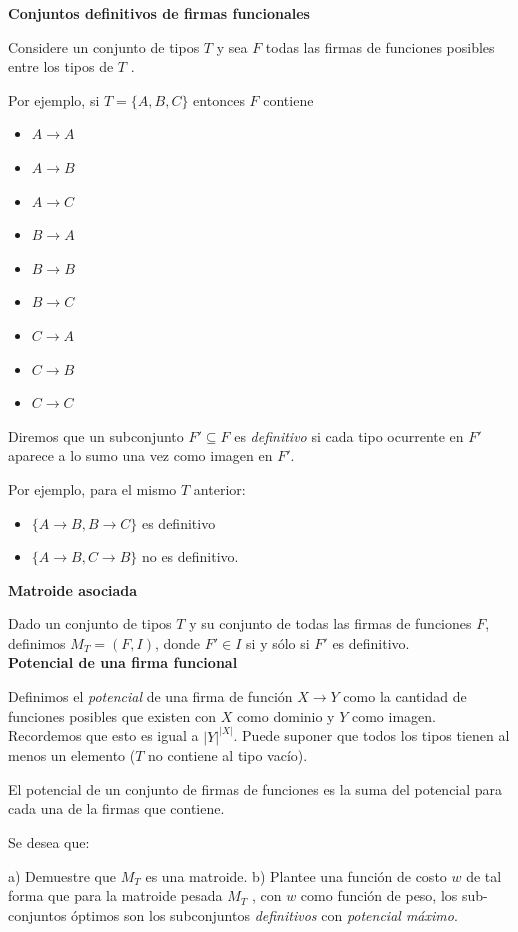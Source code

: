 \documentclass[letterpaper, 12pt]{article}
\begin{document}
\begin{enumerate}
\textbf{Conjuntos definitivos de firmas funcionales}

Considere un conjunto de tipos $T$ y sea $F$ todas las firmas de funciones posibles entre los tipos de $T$ .

Por ejemplo, si $T = \{A, B, C\}$ entonces $F$ contiene

\begin{multicols}{3}
\begin{itemize}
    \item $A \rightarrow A$
    \item $A \rightarrow B$
    \item $A \rightarrow C$
    \item $B \rightarrow A$
    \item $B \rightarrow B$
    \item $B \rightarrow C$
    \item $C \rightarrow A$
    \item $C \rightarrow B$
    \item $C \rightarrow C$
\end{itemize}
\end{multicols}

Diremos que un subconjunto $F' \subseteq F$ es \emph{definitivo} si cada tipo ocurrente en $F'$ aparece a lo sumo una vez como imagen en $F'$.

Por ejemplo, para el mismo $T$ anterior:

\begin{itemize}
    \item $\{A \rightarrow B, B \rightarrow C\}$ es definitivo
    \item $\{A \rightarrow B, C \rightarrow B\}$ no es definitivo.
\end{itemize}

\textbf{Matroide asociada}

Dado un conjunto de tipos $T$ y su conjunto de todas las firmas de funciones $F$, definimos $M_T = (F, I)$, donde $F' \in I$ si y sólo si $F'$ es definitivo. \\

\textbf{Potencial de una firma funcional}

Definimos el \emph{potencial} de una firma de función $X \rightarrow Y$ como la cantidad de funciones posibles que existen con $X$ como dominio y $Y$ como imagen. Recordemos que esto es igual a $|Y|^{|X|}$. Puede suponer que todos los tipos tienen al menos un elemento ($T$ no contiene al tipo vacío).

El potencial de un conjunto de firmas de funciones es la suma del potencial para cada una de la firmas que contiene.

Se desea que:

a) Demuestre que $M_T$ es una matroide.
b) Plantee una función de costo $w$ de tal forma que para la matroide pesada $M_T$ , con $w$ como función de peso, los sub-conjuntos óptimos son los subconjuntos \emph{definitivos} con \emph{potencial máximo}.

\end{enumerate} \vspace{4mm}
\end{document}
